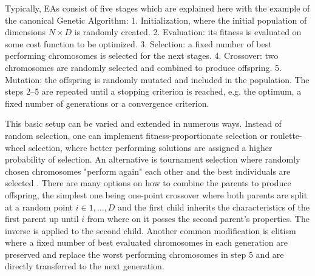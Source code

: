 Typically, EAs consist of five stages which are explained here with the example of the canonical Genetic Algorithm: 1. Initialization, where the initial population of dimensions $N \times D$ is randomly created. 2. Evaluation: its fitness is evaluated on some cost function to be optimized. 3. Selection: a fixed number of best performing chromosomes is selected for the next stages. 4. Crossover: two chromosomes are randomly selected and combined to produce offspring. 5. Mutation: the offspring is randomly mutated and included in the population. The steps 2--5 are repeated until a stopping criterion is reached, e.g. the optimum, a fixed number of generations or a convergence criterion.

This basic setup can be varied and extended in numerous ways. Instead of random selection, one can implement fitness-proportionate selection or roulette-wheel selection, where better performing solutions are assigned a higher probability of selection. An alternative is tournament selection where randomly chosen chromosomes "perform again" each other and the best individuals are selected \citep{miller1995genetic}.
There are many options on how to combine the parents to produce offspring, the simplest one being one-point crossover where both parents are split at a random point $i \in 1,\dots, D$ and the first child inherits the characteristics of the first parent up until $i$ from where on it posses the second parent's properties. The inverse is applied to the second child. Another common modification is elitism where a fixed number of best evaluated chromosomes in each generation are preserved and replace the worst performing chromosomes in step 5 and are directly transferred to the next generation. \\




